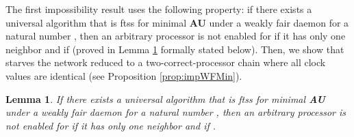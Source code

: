 \documentclass[11pt,english,letterpaper]{article}
\newtheorem{lemma}{Lemma}
\begin{document}
The first impossibility result  uses the following property: if there exists a universal algorithm  that is ftss for minimal \textbf{AU} under a weakly fair daemon for a natural number , then an arbitrary processor  is not enabled for  if it has only one neighbor  and if  (proved in Lemma \ref{lem:impWFMin} formally stated below). Then, we show that  starves the network reduced to a two-correct-processor chain where all clock values are identical (see Proposition \ref{prop:impWFMin}).

\begin{lemma}\label{lem:impWFMin}
If there exists a universal algorithm  that is ftss for minimal \textbf{AU} under a weakly fair daemon for a natural number , then an arbitrary processor  is not enabled for  if it has only one neighbor  and if .
\end{lemma}
\end{document}
